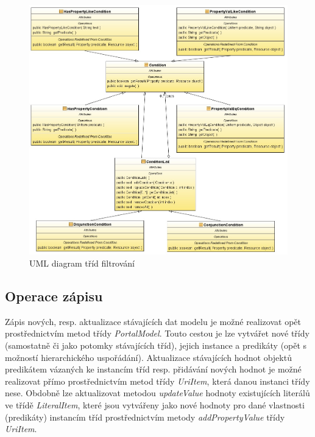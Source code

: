 \documentclass{projekt}
\begin{document}
\begin{figure}[htb]
\begin{center}
\includegraphics[scale=0.5]{filter.jpg}
\caption{UML diagram tříd filtrování}
\end{center}
\end{figure}


\subsection{Operace zápisu}
\hspace{0.65cm}Zápis nových, resp. aktualizace stávajících dat modelu je možné realizovat opět prostřednictvím metod třídy {\it PortalModel}. Touto cestou je lze vytvářet nové třídy (samostatně či jako potomky stávajících tříd), jejich instance a predikáty (opět s možností hierarchického uspořádání). Aktualizace stávajících hodnot objektů predikátem vázaných ke instancím tříd resp. přidávání nových hodnot je možné realizovat přímo prostřednictvím metod třídy {\it UriItem}, která danou instanci třídy nese. Obdobně lze aktualizovat metodou {\it updateValue} hodnoty existujících literálů ve třídě {\it LiteralItem},  které jsou vytvářeny jako nové hodnoty pro dané vlastnosti (predikáty) instancím tříd prostřednictvím metody {\it addPropertyValue} třídy {\it UriItem}.
\end{document}
